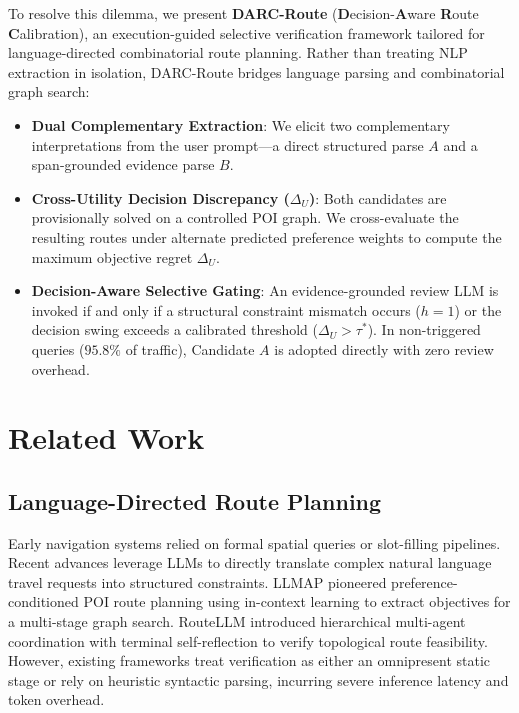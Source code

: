\documentclass[conference]{IEEEtran}
\begin{document}
To resolve this dilemma, we present \textbf{DARC-Route} (\textbf{D}ecision-\textbf{A}ware \textbf{R}oute \textbf{C}alibration), an execution-guided selective verification framework tailored for language-directed combinatorial route planning. Rather than treating NLP extraction in isolation, DARC-Route bridges language parsing and combinatorial graph search:
\begin{itemize}
    \item \textbf{Dual Complementary Extraction}: We elicit two complementary interpretations from the user prompt—a direct structured parse $A$ and a span-grounded evidence parse $B$.
    \item \textbf{Cross-Utility Decision Discrepancy ($\Delta_U$)}: Both candidates are provisionally solved on a controlled POI graph. We cross-evaluate the resulting routes under alternate predicted preference weights to compute the maximum objective regret $\Delta_U$.
    \item \textbf{Decision-Aware Selective Gating}: An evidence-grounded review LLM is invoked if and only if a structural constraint mismatch occurs ($h=1$) or the decision swing exceeds a calibrated threshold ($\Delta_U > \tau^*$). In non-triggered queries ($95.8\%$ of traffic), Candidate $A$ is adopted directly with zero review overhead.
\end{itemize}

\section{Related Work}

\subsection{Language-Directed Route Planning}
Early navigation systems relied on formal spatial queries or slot-filling pipelines. Recent advances leverage LLMs to directly translate complex natural language travel requests into structured constraints. LLMAP \cite{liang2025llmap} pioneered preference-conditioned POI route planning using in-context learning to extract objectives for a multi-stage graph search. RouteLLM \cite{wang2025constraint} introduced hierarchical multi-agent coordination with terminal self-reflection to verify topological route feasibility. However, existing frameworks treat verification as either an omnipresent static stage or rely on heuristic syntactic parsing, incurring severe inference latency and token overhead.
\end{document}

